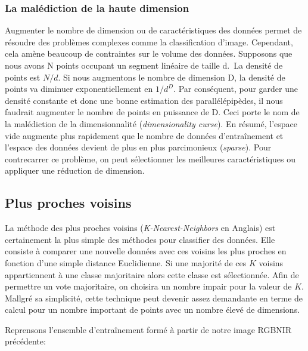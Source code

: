 \documentclass[
  11pt,
  letterpaper,
  open=any,
  twoside=false,
  french]{scrbook}
\begin{document}
\subsubsection{La malédiction de la haute
dimension}\label{la-maluxe9diction-de-la-haute-dimension}

Augmenter le nombre de dimension ou de caractéristiques des données
permet de résoudre des problèmes complexes comme la classification
d'image. Cependant, cela amène beaucoup de contraintes sur le volume des
données. Supposons que nous avons N points occupant un segment linéaire
de taille d.~La densité de points est \(N/d\). Si nous augmentons le
nombre de dimension D, la densité de points va diminuer
exponentiellement en \(1/d^D\). Par conséquent, pour garder une densité
constante et donc une bonne estimation des parallélépipèdes, il nous
faudrait augmenter le nombre de points en puissance de D. Ceci porte le
nom de la malédiction de la dimensionnalité (\emph{dimensionality
curse}). En résumé, l'espace vide augmente plus rapidement que le nombre
de données d'entraînement et l'espace des données devient de plus en
plus parcimonieux (\emph{sparse}). Pour contrecarrer ce problème, on
peut sélectionner les meilleures caractéristiques ou appliquer une
réduction de dimension.

\subsection{Plus proches voisins}\label{plus-proches-voisins}

La méthode des plus proches voisins (\emph{K-Nearest-Neighbors} en
Anglais) est certainement la plus simple des méthodes pour classifier
des données. Elle consiste à comparer une nouvelle données avec ces
voisins les plus proches en fonction d'une simple distance Euclidienne.
Si une majorité de ces \(K\) voisins appartiennent à une classe
majoritaire alors cette classe est sélectionnée. Afin de permettre un
vote majoritaire, on choisira un nombre impair pour la valeur de \(K\).
Mallgré sa simplicité, cette technique peut devenir assez demandante en
terme de calcul pour un nombre important de points avec un nombre élevé
de dimensions.

Reprensons l'ensemble d'entraînement formé à partir de notre image
RGBNIR précédente:
\end{document}
